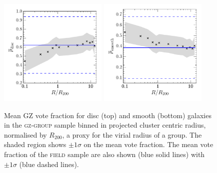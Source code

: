 \begin{figure}
\includegraphics[width=0.46\textwidth]{environment/p_disc_trend_with_log_radius_field_compare.pdf}
\includegraphics[width=0.46\textwidth]{environment/p_smooth_trend_with_log_radius_field_compare.pdf}
\caption[Mean GZ vote fractions for satellite galaxies with projected cluster centric radius]{Mean GZ vote fraction for disc (top) and smooth (bottom) galaxies in the \textsc{gz-group} sample binned in projected cluster centric radius, normalised by $R_{200}$, a proxy for the virial radius of a group. The shaded region shows $\pm1\sigma$ on the mean vote fraction. The mean vote fraction of the \textsc{field} sample are also shown (blue solid lines) with $\pm1\sigma$ (blue dashed lines).}
\label{fig:morphradius}
\end{figure}

